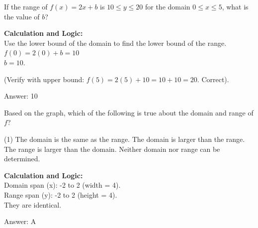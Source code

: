 \documentclass[11pt,paper=a4,answers]{exam}
\begin{document}
\begin{questions}
\question
If the range of $f(x) = 2x + b$ is $10 \leq y \leq 20$ for the domain $0 \leq x \leq 5$, what is the value of $b$?

\begin{solution}
\textbf{Calculation and Logic:} \\
Use the lower bound of the domain to find the lower bound of the range. \\
$f(0) = 2(0) + b = 10$ \\
$b = 10$.

\vspace{15pt}

(Verify with upper bound: $f(5) = 2(5) + 10 = 10 + 10 = 20$. Correct).

\vspace{30pt}

Answer: \colorbox{yellow!100}{10}
\end{solution}

\vspace{40pt}

\question
\begin{center}
\end{center}
Based on the graph, which of the following is true about the domain and range of $f$?
\begin{tasks}(1)
    \task The domain is the same as the range.
    \task The domain is larger than the range.
    \task The range is larger than the domain.
    \task Neither domain nor range can be determined.
\end{tasks}

\begin{solution}
\textbf{Calculation and Logic:} \\
Domain span (x): -2 to 2 (width = 4). \\
Range span (y): -2 to 2 (height = 4). \\
They are identical.

\vspace{30pt}

Answer: \colorbox{yellow!100}{A}
\end{solution}


\end{questions}
\end{document}
